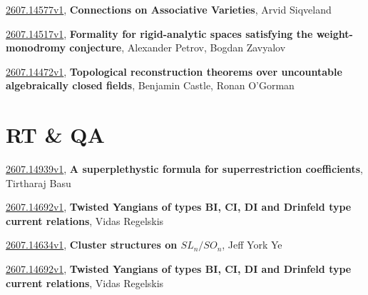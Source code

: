 \documentclass[9pt, a4paper]{article}
\theoremstyle{plain}
\theoremstyle{definition}
\theoremstyle{remark}
\newcommand{\arxiv}[3]{\href{https://arxiv.org/abs/#1}{#1}, \textbf{\textcolor{arxivblue}{#2}}, #3}
\begin{document}
\arxiv{2607.14577v1}{Connections on Associative Varieties}{Arvid Siqveland}

\arxiv{2607.14517v1}{Formality for rigid-analytic spaces satisfying the weight-monodromy conjecture}{Alexander Petrov, Bogdan Zavyalov}

\arxiv{2607.14472v1}{Topological reconstruction theorems over uncountable algebraically closed fields}{Benjamin Castle, Ronan O'Gorman}


\section{RT \& QA}
\arxiv{2607.14939v1}{A superplethystic formula for superrestriction coefficients}{Tirtharaj Basu}

\arxiv{2607.14692v1}{Twisted Yangians of types BI, CI, DI and Drinfeld type current relations}{Vidas Regelskis}

\arxiv{2607.14634v1}{Cluster structures on $SL_n/SO_n$}{Jeff York Ye}

\arxiv{2607.14692v1}{Twisted Yangians of types BI, CI, DI and Drinfeld type current relations}{Vidas Regelskis}

\end{document}
